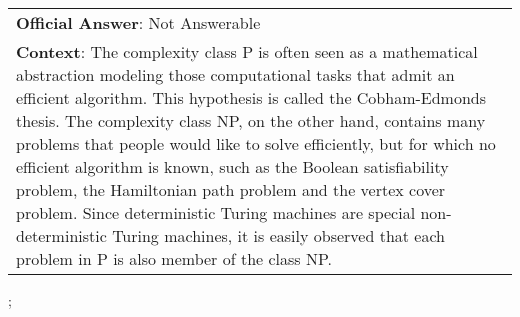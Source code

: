 \begin{figure*}[ht]
{\begin{tabular}{p{}}
            \textbf{Official Answer}: Not Answerable                                                                                                                                                                                                                                                                                                                                                                                                                                                                                                                                                                                                              \\
            \textbf{Context}: The complexity class P is often seen as a mathematical abstraction modeling those computational tasks that admit an efficient algorithm. This hypothesis is called the Cobham-Edmonds thesis. The complexity class NP, on the other hand, contains many problems that people would like to solve efficiently, but for which no efficient algorithm is known, such as the Boolean satisfiability problem, the Hamiltonian path problem and the vertex cover problem. Since deterministic Turing machines are special non-deterministic Turing machines, it is easily observed that each problem in P is also member of the class NP. \\
        \end{tabular}
    };
    \label{fig:ex-5ad567055b96ef001a10adeb}
\end{figure*}

